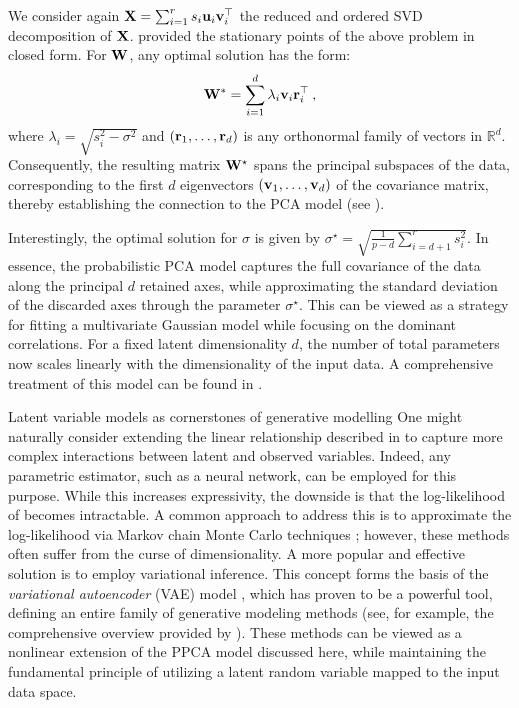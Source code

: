 We consider again ${\mathbf{X}} = \sum_{i=1}^{r} s_i {\mathbf{u}}_i {\mathbf{v}}_i^\top$ the reduced and ordered SVD decomposition of ${\mathbf{X}}$. \cite{tipping1999probabilistic} provided the stationary points of the above problem in closed form. For ${\mathbf{W}}$, any optimal solution has the form:
\begin{align}
    {\mathbf{W}}^* = \sum_{i=1}^d \lambda_i {\mathbf{v}}_i {\mathbf{r}}_i^\top \:,
\end{align}
where $\lambda_i = \sqrt{s_i^{2} - \sigma^{2}}$ and $({\mathbf{r}}_1, \dots, {\mathbf{r}}_d)$ is any orthonormal family of vectors in $\mathbb{R}^d$. Consequently, the resulting matrix ${\mathbf{W}}^\star$ spans the principal subspaces of the data, corresponding to the first $d$ eigenvectors $({\mathbf{v}}_1, \dots, {\mathbf{v}}_d)$ of the covariance matrix, thereby establishing the connection to the PCA model (see ).

Interestingly, the optimal solution for $\sigma$ is given by $\sigma^\star = \sqrt{\frac{1}{p-d} \sum_{i=d+1}^{r} s^2_i}$. In essence, the probabilistic PCA model captures the full covariance of the data along the principal $d$ retained axes, while approximating the standard deviation of the discarded axes through the parameter $\sigma^\star$. This can be viewed as a strategy for fitting a multivariate Gaussian model while focusing on the dominant correlations. For a fixed latent dimensionality $d$, the number of total parameters now scales linearly with the dimensionality of the input data. A comprehensive treatment of this model can be found in \citep{bishop2006pattern}.

\begin{mem1}{Latent variable models as cornerstones of generative modelling}
    One might naturally consider extending the linear relationship described in  to capture more complex interactions between latent and observed variables. Indeed, any parametric estimator, such as a neural network, can be employed for this purpose. While this increases expressivity, the downside is that the log-likelihood of  becomes intractable. A common approach to address this is to approximate the log-likelihood via Markov chain Monte Carlo techniques \citep{andrieu2003introduction}; however, these methods often suffer from the curse of dimensionality. A more popular and effective solution is to employ variational inference. This concept forms the basis of the \emph{variational autoencoder} (VAE) model \citep{kingma2013auto}, which has proven to be a powerful tool, defining an entire family of generative modeling methods (see, for example, the comprehensive overview provided by \cite{tomczak2021latent}). These methods can be viewed as a nonlinear extension of the PPCA model discussed here, while maintaining the fundamental principle of utilizing a latent random variable mapped to the input data space.
\end{mem1}


